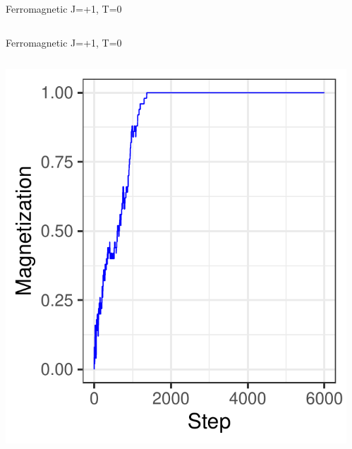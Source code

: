 \documentclass{beamer}
\begin{document}
\begin{frame}{Ferromagnetic J=+1, T=0}
\begin{columns}
\begin{column}{0.5\textwidth}
\begin{center}
     \end{center}
\end{column}
\end{columns}
\end{frame}

\begin{frame}{Ferromagnetic J=+1, T=0}
\begin{columns}
\begin{column}{0.5\textwidth}
    \begin{center}
     \includegraphics[width=\textwidth]{Pic/J+1_10_6000_T=0_Magnetization.pdf}
     \end{center}
\end{column}
\begin{column}{0.5\textwidth}
    \begin{center}

\end{center}
\end{column}
\end{columns}
\end{frame}
\end{document}
